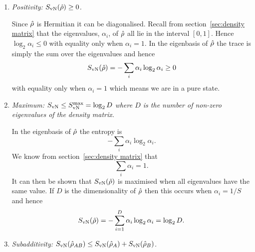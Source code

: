\begin{enumerate}
        \item \emph{Positivity: \(S_{\mathrm{vN}}(\hat{\rho}) \ge 0\).}
        
        Since \(\hat{\rho}\) is Hermitian it can be diagonalised.
        Recall from section~\ref{sec:density matrix} that the eigenvalues, \(\alpha_i\), of \(\hat{\rho}\) all lie in the interval \([0, 1]\).
        Hence \(\log_2\alpha_i \le 0\) with equality only when \(\alpha_i = 1\).
        In the eigenbasis of \(\hat{\rho}\) the trace is simply the sum over the eigenvalues and hence
        \[S_{\mathrm{vN}}(\hat{\rho}) = -\sum_i \alpha_i \log_2\alpha_i \ge 0\]
        with equality only when \(\alpha_i = 1\) which means we are in a pure state.
        
        \item \emph{Maximum: \(S_{\mathrm{vN}} \le S_{\mathrm{vN}}^{\max} = \log_2 D\) where \(D\) is the number of non-zero eigenvalues of the density matrix.}
        
        In the eigenbasis of \(\hat{\rho}\) the entropy is
        \[-\sum_i \alpha_i \log_2 \alpha_i.\]
        We know from section~\ref{sec:density matrix} that
        \[\sum_i \alpha_i = 1.\]
        It can then be shown that \(S_{\mathrm{vN}}(\hat{\rho})\) is maximised when all eigenvalues have the same value.
        If \(D\) is the dimensionality of \(\hat{\rho}\) then this occurs when \(\alpha_i = 1/S\) and hence
        \[S_{\mathrm{vN}}(\hat{\rho}) = - \sum_{i=1}^D \alpha_i\log_2\alpha_i=\log_2 D.\]
        
        \item \emph{Subadditivity: \(S_{\mathrm{vN}}(\hat{\rho}_{AB}) \le S_{\mathrm{vN}}(\hat{\rho}_A) + S_{\mathrm{vN}}(\hat{\rho}_B)\).}
        

\end{enumerate}
